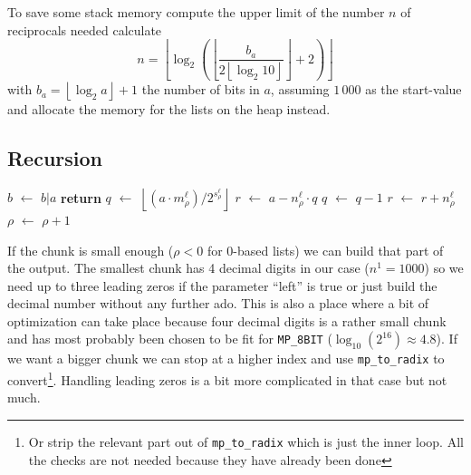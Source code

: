 \documentclass[a4paper,10pt]{article}
\newcommand*\Let[2]{\State #1 $\gets$ #2}
\newcommand{\RETURN}{\State \textbf{return} }
\providecommand{\floor}[1]{\left\lfloor#1\right\rfloor}
\DeclareMathOperator{\AND}{\wedge}
\theoremstyle{plain} %
\theoremstyle{definition}
\theoremstyle{remark}
\newcommand*{\smalltt}[1]{\small\texttt{#1}}
\begin{document}
To save some stack memory compute the upper limit of the number $n$ of reciprocals needed calculate
\begin{equation}
n = \floor{\log_2 \left( \floor{\frac{b_a}{2\floor{\log_2 10}}} + 2 \right)  }
\end{equation}
with $b_a = \floor{\log_2 a} + 1$ the number of bits in $a$, assuming $1\,000$ as the start-value and allocate the memory for the lists on the heap instead.

\subsection{Recursion}

\begin{center}
  \begin{algorithmic}[1]
      \Let{$b$}{$b | a$}
      \RETURN
    \Else
      \Let{$q$}{$\floor{\left(a\cdot m^\ell_\rho\right) / 2^{s^\ell_\rho}}$}
      \Let{$r$}{$ a - n^\ell_\rho \cdot q$}
        \Let{$q$}{$q - 1$}
        \Let{$r$}{$r + n^\ell_\rho$}
      \EndIf
      \Let{$\rho$}{$\rho + 1$}
      \If{$\left(L = 1\right) \AND \left(q = 0\right) $}
        \State {}
      \Else
        \State {}
        \State {}
      \EndIf
    \EndIf
    \EndFunction
  \end{algorithmic}
\end{center}

If the chunk is small enough ($\rho < 0$ for 0-based lists) we can build that part of the output.
The smallest chunk has 4 decimal digits in our case ($n^1 = 1000$) so we need up to three leading zeros if the parameter ``left'' is true or just build the decimal number without any further ado.
This is also a place where a bit of optimization can take place because four decimal digits is a rather small chunk and has most probably been chosen to be fit for \smalltt{MP\_8BIT} ($\log_{10}(2^{16}) \approx 4.8$).
If we want a bigger chunk we can stop at a higher index and use \smalltt{mp\_to\_radix} to convert\footnote{Or strip the relevant part out of \smalltt{mp\_to\_radix} which is just the inner loop. All the checks are not needed because they have already been done}. Handling leading zeros is a bit more complicated in that case but not much.
\end{document}
